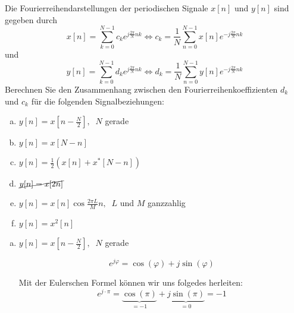 \begin{uebsp}
\begin{Exercise}
    Die Fourierreihendarstellungen der periodischen Signale $x[n]$ und $y[n]$ sind gegeben durch
    \[x[n]=\sum_{k=0}^{N-1}c_ke^{j\frac{2\pi}{N}nk}\Leftrightarrow c_k=\frac{1}{N}\sum_{n=0}^{N-1}x[n]e^{-j\frac{2\pi}{N}nk}\]
    und 
    \[y[n]=\sum_{k=0}^{N-1}d_ke^{j\frac{2\pi}{N}nk}\Leftrightarrow d_k=\frac{1}{N}\sum_{n=0}^{N-1}y[n]e^{-j\frac{2\pi}{N}nk}\]
    Berechnen Sie den Zusammenhang zwischen den Fourierreihenkoeffizienten $d_k$ und $c_k$ für die folgenden Signalbeziehungen:
    \begin{enumerate}[a)]
        \item $y[n]=x\left[n-\frac{N}{2}\right],\;\;N$ gerade
        \item $y[n]=x\left[N-n\right]$
        \item $y[n]=\frac{1}{2}\left(x[n]+x^*\left[N-n\right]\right)$
        \item $\cancel{y[n]=x[2n]}$
        \item $y[n]=x[n]\cos\frac{2\pi L}{M}n,\;\;L$ und $M$ ganzzahlig
        \item $y[n]=x^2[n]$
    \end{enumerate}
\end{Exercise}
\begin{Answer}
     \begin{enumerate}[a)]
        \item $y[n]=x\left[n-\frac{N}{2}\right],\;\;N$ gerade
            \begin{definition}
                \[e^{j\varphi}=\cos(\varphi)+j\sin(\varphi)\]
            \end{definition}
            \begin{uebsp_theory}
                Mit der Eulerschen Formel können wir uns folgedes herleiten:
                \[e^{j\cdot\pi}=\underbrace{\cos(\pi)}_{=-1}+\underbrace{j\sin(\pi)}_{=0}=-1\]
            \end{uebsp_theory}


\end{enumerate}
\end{Answer}
\end{uebsp}
